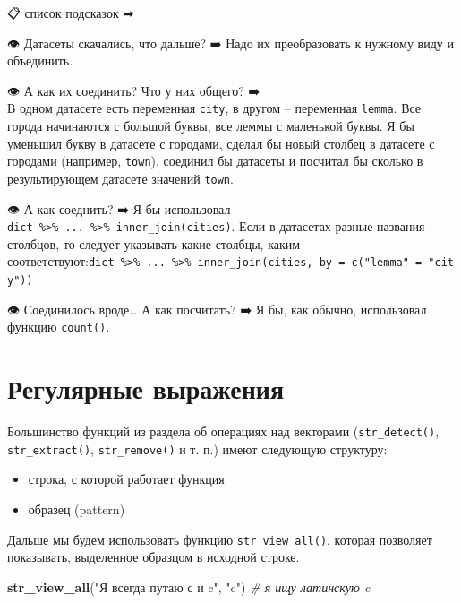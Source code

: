 \documentclass[
]{book}
\newenvironment{Shaded}{\begin{snugshade}}{\end{snugshade}}
\newcommand{\CommentTok}[1]{\textcolor[rgb]{0.56,0.35,0.01}{\textit{#1}}}
\newcommand{\KeywordTok}[1]{\textcolor[rgb]{0.13,0.29,0.53}{\textbf{#1}}}
\newcommand{\NormalTok}[1]{#1}
\newcommand{\StringTok}[1]{\textcolor[rgb]{0.31,0.60,0.02}{#1}}
\providecommand{\tightlist}{%
  \setlength{\itemsep}{0pt}\setlength{\parskip}{0pt}}
\begin{document}
📋 список подсказок ➡

👁 Датасеты скачались, что дальше? ➡
Надо их преобразовать к нужному виду и объединить.

👁 А как их соединить? Что у них общего? ➡ \\
В одном датасете есть переменная \texttt{city}, в другом -- переменная \texttt{lemma}. Все города начинаются с большой буквы, все леммы с маленькой буквы. Я бы уменьшил букву в датасете с городами, сделал бы новый столбец в датасете с городами (например, \texttt{town}), соединил бы датасеты и посчитал бы сколько в результирующем датасете значений \texttt{town}.

👁 А как соеднить? ➡
Я бы использовал \texttt{dict\ \%\textgreater{}\%\ ...\ \%\textgreater{}\%\ inner\_join(cities)}. Если в датасетах разные названия столбцов, то следует указывать какие столбцы, каким соответствуют:\texttt{dict\ \%\textgreater{}\%\ ...\ \%\textgreater{}\%\ inner\_join(cities,\ by\ =\ c("lemma"\ =\ "city"))}

👁 Соединилось вроде\ldots{} А как посчитать? ➡
Я бы, как обычно, использовал функцию \texttt{count()}.

\hypertarget{ux440ux435ux433ux443ux43bux44fux440ux43dux44bux435-ux432ux44bux440ux430ux436ux435ux43dux438ux44f}{%
\section{Регулярные выражения}\label{ux440ux435ux433ux443ux43bux44fux440ux43dux44bux435-ux432ux44bux440ux430ux436ux435ux43dux438ux44f}}

Большинство функций из раздела об операциях над векторами (\texttt{str\_detect()}, \texttt{str\_extract()}, \texttt{str\_remove()} и т. п.) имеют следующую структуру:

\begin{itemize}
\tightlist
\item
  строка, с которой работает функция
\item
  образец (pattern)
\end{itemize}

Дальше мы будем использовать функцию \texttt{str\_view\_all()}, которая позволяет показывать, выделенное образцом в исходной строке.

\begin{Shaded}
\begin{Highlighting}[]
\KeywordTok{str_view_all}\NormalTok{(}\StringTok{"Я всегда путаю с и c"}\NormalTok{, }\StringTok{"c"}\NormalTok{) }\CommentTok{# я ищу латинскую c}
\end{Highlighting}
\end{Shaded}
\end{document}
